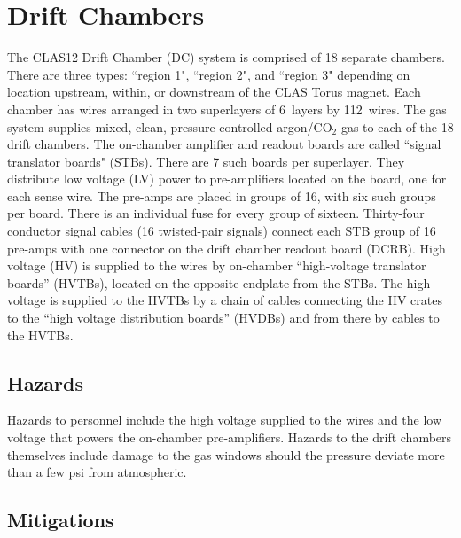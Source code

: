 \section{Drift Chambers}

The CLAS12 Drift Chamber (DC) system is comprised of 18 separate chambers. There are 
three types: ``region 1", ``region 2", and ``region 3" depending on location upstream, 
within, or downstream of the CLAS Torus magnet. Each chamber has wires arranged in two 
superlayers of 6~layers by 112~wires. The gas system supplies mixed, clean, 
pressure-controlled argon/CO$_2$ gas to each of the 18 drift chambers. The on-chamber 
amplifier and readout boards are called ``signal translator boards" (STBs). There are 7 such 
boards per superlayer. They distribute low voltage (LV) power to pre-amplifiers located on the 
board, one for each sense wire. The pre-amps are placed in groups of 16, with six such groups 
per board. There is an individual fuse for every group of sixteen. Thirty-four conductor signal 
cables (16 twisted-pair signals) connect each STB group of 16 pre-amps with one connector on 
the drift chamber readout board (DCRB). High voltage (HV) is supplied to the wires by on-chamber 
``high-voltage translator boards'' (HVTBs), located on the opposite endplate from the STBs. The 
high voltage is supplied to the HVTBs by a chain of cables connecting the HV crates to the 
``high voltage distribution boards'' (HVDBs) and from there by cables to the HVTBs.

\subsection{Hazards} 

Hazards to personnel include the high voltage supplied to the wires and the low voltage that 
powers the on-chamber pre-amplifiers. Hazards to the drift chambers themselves include damage 
to the gas windows should the pressure deviate more than a few psi from atmospheric. 

\subsection{Mitigations}

